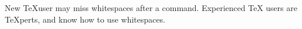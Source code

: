 \documentclass{article}
\begin{document}
New \TeX user may miss whitespaces
after a command. %
Experienced \TeX{} users are
\TeX perts, and know how to use
whitespaces. %
\end{document}
